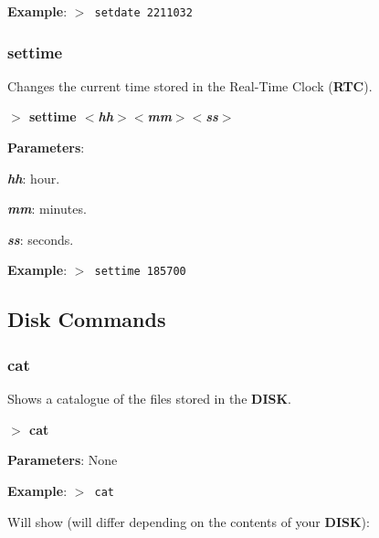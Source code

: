 \documentclass[a4paper,11pt]{article}
\begin{document}
        \textbf{Example}: \texttt{$>$ setdate 2211032}

        \subsubsection{{\color{blue}settime}}
        Changes the current time stored in the Real-Time Clock (\textbf{RTC}).

        \hspace{1.9cm}\textbf{$>$ settime \textit{$<$hh$>$$<$mm$>$$<$ss$>$}}

        \textbf{Parameters}:

        \hspace{1cm}\textbf{\textit{hh}}: hour.

        \hspace{1cm}\textbf{\textit{mm}}: minutes.

        \hspace{1cm}\textbf{\textit{ss}}: seconds.

        \textbf{Example}: \texttt{$>$ settime 185700}

    \subsection{Disk Commands}\label{dskcmds}
        \subsubsection{{\color{blue}cat}}\label{cmd:cat}
        Shows a catalogue of the files stored in the \textbf{DISK}.

        \hspace{1.9cm}\textbf{$>$ cat}

        \textbf{Parameters}: None

        \textbf{Example}: \texttt{$>$ cat}

        Will show (will differ depending on the contents of your \textbf{DISK}):
\end{document}
